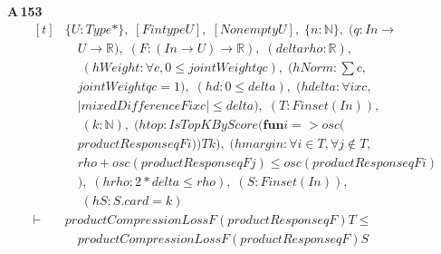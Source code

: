 \noindent\textbf{A\,153}\quad{}
{\footnotesize\[ \begin{aligned}[t]
&\{ \mathit{U} : \mathit{Type}*\},\; [\mathit{Fintype} \mathit{U}],\; [\mathit{Nonempty} \mathit{U}],\; \{ \mathit{n} : \mathbb{N} \},\; (\mathit{q} : \mathit{I} \mathit{n} \to\\
&\quad \mathit{U} \to \mathbb{R} ),\; (\mathit{F} : (\mathit{I} \mathit{n} \to \mathit{U}) \to \mathbb{R} ),\; (\mathit{delta} \mathit{rho} : \mathbb{R} ),\\
&\quad \; (\mathit{hWeight} : \forall \mathit{c},0 \leq \mathit{jointWeight} \mathit{q} \mathit{c}),\; (\mathit{hNorm} : \textstyle\sum \mathit{c},\\
&\quad \mathit{jointWeight} \mathit{q} \mathit{c}=1),\; (\mathit{hd} : 0 \leq \mathit{delta}),\; (\mathit{hdelta} : \forall \mathit{i} \mathit{x} \mathit{c},\\
&\quad |\mathit{mixedDifference} \mathit{F} \mathit{i} \mathit{x} \mathit{c}| \leq \mathit{delta}),\; (\mathit{T} : \mathit{Finset} (\mathit{I} \mathit{n})),\\
&\quad \; (\mathit{k} : \mathbb{N} ),\; (\mathit{htop} : \mathit{IsTopKByScore} (\mathbf{fun} \mathit{i} => \mathit{osc} (\\
&\quad \mathit{productResponse} \mathit{q} \mathit{F} \mathit{i})) \mathit{T} \mathit{k}),\; (\mathit{hmargin} : \forall \mathit{i} \in \mathit{T},\forall \mathit{j} \notin \mathit{T},\\
&\quad \mathit{rho}+\mathit{osc} (\mathit{productResponse} \mathit{q} \mathit{F} \mathit{j}) \leq \mathit{osc} (\mathit{productResponse} \mathit{q} \mathit{F} \mathit{i})\\
&\quad ),\; (\mathit{hrho} : 2*\mathit{delta} \leq \mathit{rho}),\; (\mathit{S} : \mathit{Finset} (\mathit{I} \mathit{n})),\\
&\quad \; (\mathit{hS} : \mathit{S}.\mathit{card}=\mathit{k})\\
\vdash\;&\mathit{productCompressionLoss} \mathit{F} (\mathit{productResponse} \mathit{q} \mathit{F}) \mathit{T} \leq\\
&\quad \mathit{productCompressionLoss} \mathit{F} (\mathit{productResponse} \mathit{q} \mathit{F}) \mathit{S}
\end{aligned} \]}

